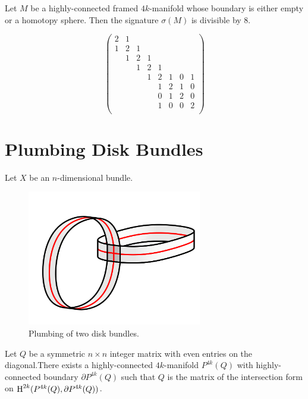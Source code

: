 \begin{theorem}\label{thm:signature_divisible_by_8}
	Let $M$ be a highly-connected framed $4k$-manifold whose boundary is either empty or a homotopy sphere. Then the signature $\sigma(M)$ is divisible by $8$.
\end{theorem}

\[
	\begin{pmatrix}
		2 & 1 &   &   &   &   &   &   \\
		1 & 2 & 1 &   &   &   &   &   \\
		  & 1 & 2 & 1 &   &   &   &   \\
		  &   & 1 & 2 & 1 &   &   &   \\
		  &   &   & 1 & 2 & 1 & 0 & 1 \\
		  &   &   &   & 1 & 2 & 1 & 0 \\
		  &   &   &   & 0 & 1 & 2 & 0 \\
		  &   &   &   & 1 & 0 & 0 & 2 \\
	\end{pmatrix}
\]

\section{Plumbing Disk Bundles}

Let $X$ be an $n$-dimensional bundle.


\begin{figure}[ht]
	\centering
	\includegraphics[width=3in]{graphics/temp-diagrams/disk-bundle-plumbing-example.png}
	\caption{Plumbing of two disk bundles.}\label{fig:disk-bundle-plumbing-example}
\end{figure}

\begin{theorem}
	Let $Q$ be a symmetric $n\times n$ integer matrix with even entries on the diagonal.There exists a highly-connected $4k$-manifold $P^{4k}(Q)$ with highly-connected boundary $\partial P^{4k}(Q)$ such that $Q$ is the matrix of the intersection form on $\operatorname{H}^{2k}(P^{4k}(Q), \partial P^{4k}(Q))$.
\end{theorem}

